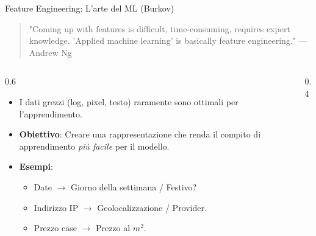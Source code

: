 \documentclass[aspectratio=169, 10pt]{beamer}
\begin{document}
\begin{frame}{Feature Engineering: L'arte del ML (Burkov)}
    \begin{quote}
        "Coming up with features is difficult, time-consuming, requires expert knowledge. 'Applied machine learning' is basically feature engineering." — Andrew Ng
    \end{quote}
    
    \begin{columns}[T]
        \begin{column}{0.6\textwidth}
            \begin{itemize}
                \item I dati grezzi (log, pixel, testo) raramente sono ottimali per l'apprendimento.
                \item \textbf{Obiettivo}: Creare una rappresentazione che renda il compito di apprendimento \emph{più facile} per il modello.
                \item \textbf{Esempi}:
                \begin{itemize}
                    \item Date $\to$ Giorno della settimana / Festivo?
                    \item Indirizzo IP $\to$ Geolocalizzazione / Provider.
                    \item Prezzo case $\to$ Prezzo al $m^2$.
                \end{itemize}
            \end{itemize}
        \end{column}
        \begin{column}{0.4\textwidth}
            \centering
        \end{column}
    \end{columns}
\end{frame}
\end{document}
